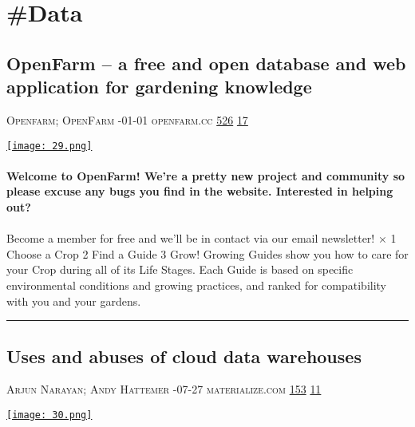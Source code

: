 \documentclass[10pt,a4paper]{article}
\begin{document}
\newpage
\section{\#Data}

\begin{multicols*}{2}

\noindent\begin{minipage}{\linewidth}
\subsection{OpenFarm – a free and open database and web application for gardening knowledge}
\textsc{\footnotesize
{\scriptsize\faUser}\space 
Openfarm; OpenFarm 
{\scriptsize\faCalendar}-01-01 
{\scriptsize\faGlobe}\space 
openfarm.cc 
{\scriptsize\faThumbsOUp}\space 
\href{http://news.ycombinator.com/item?id=37125830\&utm\_term=comment}{526} 
{\scriptsize\faComments}\space 
\href{http://news.ycombinator.com/item?id=37125830\&utm\_term=comment}{17} 
}
\par\medskip\noindent
\href{https://openfarm.cc?utm\_source=hackernewsletter\&utm\_medium=email\&utm\_term=data}{
    \texttt{[image: 29.png]}
}
\end{minipage}
\paragraph{}
\textbf{Welcome to OpenFarm! We're a pretty new project and community so please excuse any bugs you find in the website. Interested in helping out?}
\paragraph{}
 Become a member for free and we'll be in contact via our email newsletter!
×
1
Choose a Crop
2
Find a Guide
3
Grow!
Growing Guides show you how to care for your Crop during all
of its Life Stages. Each Guide is based on specific environmental
conditions and growing practices, and ranked for compatibility
with you and your gardens.
\par\noindent\textcolor{red}{\rule{\linewidth}{0.2mm}}
\vfill
\null
\noindent\begin{minipage}{\linewidth}
\subsection{Uses and abuses of cloud data warehouses}
\textsc{\footnotesize
{\scriptsize\faUser}\space 
Arjun Narayan; Andy Hattemer 
{\scriptsize\faCalendar}-07-27 
{\scriptsize\faGlobe}\space 
materialize.com 
{\scriptsize\faThumbsOUp}\space 
\href{http://news.ycombinator.com/item?id=37146532\&utm\_term=comment}{153} 
{\scriptsize\faComments}\space 
\href{http://news.ycombinator.com/item?id=37146532\&utm\_term=comment}{11} 
}
\par\medskip\noindent
\href{https://materialize.com/blog/warehouse-abuse/?utm\_source=hackernewsletter\&utm\_medium=email\&utm\_term=data}{
    \texttt{[image: 30.png]}
}
\end{minipage}

\end{multicols*}
\end{document}
